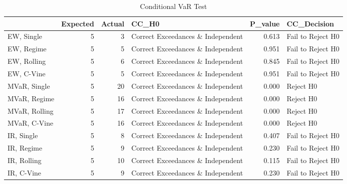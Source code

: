 \begin{table}

\caption{Conditional VaR Test}
\centering
\begin{tabular}[t]{lrrlrl}
\toprule
  & Expected & Actual & CC\_H0 & P\_value & CC\_Decision\\
\midrule
EW, Single & 5 & 3 & Correct Exceedances \& Independent & 0.613 & Fail to Reject H0\\
EW, Regime & 5 & 5 & Correct Exceedances \& Independent & 0.951 & Fail to Reject H0\\
EW, Rolling & 5 & 6 & Correct Exceedances \& Independent & 0.845 & Fail to Reject H0\\
EW, C-Vine & 5 & 5 & Correct Exceedances \& Independent & 0.951 & Fail to Reject H0\\
MVaR, Single & 5 & 20 & Correct Exceedances \& Independent & 0.000 & Reject H0\\
\addlinespace
MVaR, Regime & 5 & 16 & Correct Exceedances \& Independent & 0.000 & Reject H0\\
MVaR, Rolling & 5 & 17 & Correct Exceedances \& Independent & 0.000 & Reject H0\\
MVaR, C-Vine & 5 & 16 & Correct Exceedances \& Independent & 0.000 & Reject H0\\
IR, Single & 5 & 8 & Correct Exceedances \& Independent & 0.407 & Fail to Reject H0\\
IR, Regime & 5 & 9 & Correct Exceedances \& Independent & 0.230 & Fail to Reject H0\\
\addlinespace
IR, Rolling & 5 & 10 & Correct Exceedances \& Independent & 0.115 & Fail to Reject H0\\
IR, C-Vine & 5 & 9 & Correct Exceedances \& Independent & 0.230 & Fail to Reject H0\\
\bottomrule
\end{tabular}
\end{table}
